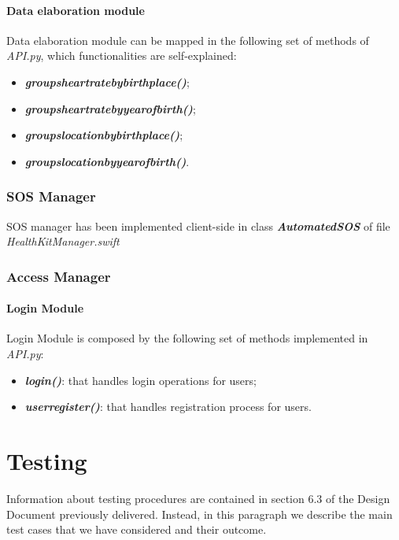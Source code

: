 \documentclass{article}
\begin{document}
\paragraph{Data elaboration module}
Data elaboration module can be mapped in the following set of methods of \textit{API.py}, which functionalities are self-explained:
\begin{itemize}
	\item \textit{\textbf{groups\textunderscore heart\textunderscore rate\textunderscore by\textunderscore birth\textunderscore place()}};
	\item \textit{\textbf{groups\textunderscore heart\textunderscore rate\textunderscore by\textunderscore year\textunderscore of\textunderscore birth()}};
	\item \textit{\textbf{groups\textunderscore location\textunderscore by\textunderscore birth\textunderscore place()}};
	\item \textit{\textbf{groups\textunderscore location\textunderscore by\textunderscore year\textunderscore of\textunderscore birth()}}.
\end{itemize}  

\subsubsection{SOS Manager}
SOS manager has been implemented client-side in class \textbf{\textit{AutomatedSOS}} of file \textit{HealthKitManager.swift}

\subsubsection{Access Manager}
\paragraph{Login Module}
Login Module is composed by the following set of methods implemented in \textit{API.py}:
\begin{itemize}
	\item \textit{\textbf{login()}}: that handles login operations for users;
	\item \textit{\textbf{user\textunderscore register()}}: that handles registration process for users.
\end{itemize}

\newpage
\section{Testing}
Information about testing procedures are contained in section 6.3 of the Design Document previously delivered. \newline
Instead, in this paragraph we describe the main test cases that we have considered and their outcome.
\end{document}
